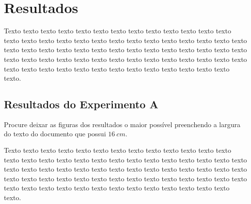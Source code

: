 \chapter{Resultados}
\label{chap:resultados}

Texto texto texto texto texto texto texto texto texto texto texto texto texto texto texto texto texto texto texto texto texto texto texto texto texto texto texto texto texto texto texto texto texto texto texto texto texto texto texto texto texto texto texto texto texto texto texto texto texto texto texto texto texto texto texto texto texto texto texto texto texto texto texto texto texto texto texto texto texto.

\section{Resultados do Experimento A}
\label{sec:resultados-do-experimento-a}

Procure deixar as figuras dos resultados o maior possível preenchendo a largura do texto do documento que possui $16~cm$.

\begin{figure}[h!]
        \captionsetup{width=16cm}
			
\end{figure}

Texto texto texto texto texto texto texto texto texto texto texto texto texto texto texto texto texto texto texto texto texto texto texto texto texto texto texto texto texto texto texto texto texto texto texto texto texto texto texto texto texto texto texto texto texto texto texto texto texto texto texto texto texto texto texto texto texto texto texto texto texto texto texto texto texto texto texto texto texto.

